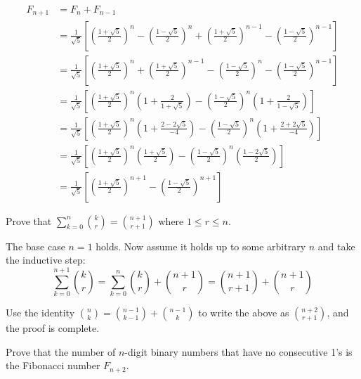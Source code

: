\documentclass{article}
\begin{document}
\begin{align*}
  F_{n+1} & = F_n + F_{n-1}                                                                                                                                                                                           \\
          & = \frac{1}{\sqrt{5}}\left[ \left(\frac{1 + \sqrt{5}}{2} \right)^n - \left(\frac{1 - \sqrt{5}}{2}\right)^n + \left(\frac{1 + \sqrt{5}}{2}\right)^{n-1} - \left(\frac{1 - \sqrt{5}}{2}\right)^{n-1} \right] \\
          & = \frac{1}{\sqrt{5}}\left[ \left( \frac{1 + \sqrt{5}}{2}\right)^n + \left(\frac{1 + \sqrt{5}}{2}\right)^{n-1} - \left(\frac{1 - \sqrt{5}}{2}\right)^n - \left(\frac{1 - \sqrt{5}}{2}\right)^{n-1}\right]  \\
          & = \frac{1}{\sqrt{5}}\left[ \left(\frac{1 + \sqrt{5}}{2}\right)^n\left(1 + \frac{2}{1 + \sqrt{5}}\right)  - \left(\frac{1 - \sqrt{5}}{2}\right)^n\left(1 + \frac{2}{1 - \sqrt{5}}\right)\right]            \\
          & = \frac{1}{\sqrt{5}}\left[ \left(\frac{1 + \sqrt{5}}{2}\right)^n\left(1 + \frac{2 - 2\sqrt{5}}{-4}\right)  - \left(\frac{1 - \sqrt{5}}{2}\right)^n\left(1 + \frac{2 + 2\sqrt{5}}{-4}\right)\right]        \\
          & = \frac{1}{\sqrt{5}}\left[ \left(\frac{1 + \sqrt{5}}{2}\right)^n\left(\frac{1 + \sqrt{5}}{2}\right)  - \left(\frac{1 - \sqrt{5}}{2}\right)^n\left(\frac{1 -  2\sqrt{5}}{2}\right)\right]                  \\
          & = \frac{1}{\sqrt{5}}\left[ \left(\frac{1 + \sqrt{5}}{2}\right)^{n+1} - \left(\frac{1 - \sqrt{5}}{2}\right)^{n+1}\right]
\end{align*}

\begin{problem}
Prove that $\sum\limits_{k=0}^n \binom{k}{r} = \binom{n + 1}{r + 1}$ where $1 \leq r \leq n$.
\end{problem}

The base case $n = 1$ holds. Now assume it holds up to some arbitrary $n$ and take the inductive step:
$$\sum_{k=0}^{n+1}\binom{k}{r} = \sum_{k=0}^n \binom{k}{r} + \binom{n + 1}{r} = \binom{n + 1}{r + 1} + \binom{n + 1}{r}$$

Use the identity $\binom{n}{k} = \binom{n-1}{k - 1} + \binom{n-1}{k}$ to write the above as $\binom{n+2}{r + 1}$, and the proof is complete.

\begin{problem}
Prove that the number of $n$-digit binary numbers that have no consecutive 1's is the Fibonacci number $F_{n+2}$.
\end{problem}
\end{document}
